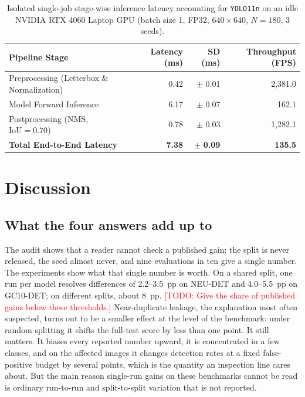 \documentclass[pdflatex,sn-apa]{sn-jnl}
\newcommand{\todo}[1]{\textcolor{red}{[TODO: #1]}}
\begin{document}
\begin{table}[htbp]
\centering
\footnotesize
\setlength{\tabcolsep}{5pt}
\caption{Isolated single-job stage-wise inference latency accounting for \texttt{YOLO11n} on an idle NVIDIA RTX 4060 Laptop GPU (batch size 1, FP32, $640\times 640$, $N=180$, 3 seeds).}
\label{tab:latency}
\begin{tabular}{l r r r}
\toprule
\textbf{Pipeline Stage} & \textbf{Latency (ms)} & \textbf{SD (ms)} & \textbf{Throughput (FPS)} \\
\midrule
Preprocessing (Letterbox \& Normalization) & 0.42 & $\pm$ 0.01 & 2,381.0 \\
Model Forward Inference & 6.17 & $\pm$ 0.07 & 162.1 \\
Postprocessing (NMS, $\text{IoU}=0.70$) & 0.78 & $\pm$ 0.03 & 1,282.1 \\
\midrule
\textbf{Total End-to-End Latency} & \textbf{7.38} & $\pm$ \textbf{0.09} & \textbf{135.5} \\
\bottomrule
\end{tabular}
\end{table}

\section{Discussion}\label{sec:discussion}

\subsection{What the four answers add up to}
The audit shows that a reader cannot check a published gain: the split is never released, the seed almost never, and nine evaluations in ten give a single number. The experiments show what that single number is worth. On a shared split, one run per model resolves differences of 2.2--3.5~pp on NEU-DET and 4.0--5.5~pp on GC10-DET; on different splits, about 8~pp. \todo{Give the share of published gains below these thresholds.} Near-duplicate leakage, the explanation most often suspected, turns out to be a smaller effect at the level of the benchmark: under random splitting it shifts the full-test score by less than one point. It still matters. It biases every reported number upward, it is concentrated in a few classes, and on the affected images it changes detection rates at a fixed false-positive budget by several points, which is the quantity an inspection line cares about. But the main reason single-run gains on these benchmarks cannot be read is ordinary run-to-run and split-to-split variation that is not reported.
\end{document}
